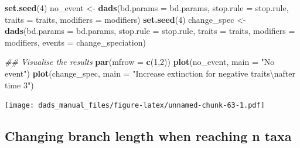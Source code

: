 \documentclass[]{book}
\newenvironment{Shaded}{\begin{snugshade}}{\end{snugshade}}
\newcommand{\CharTok}[1]{\textcolor[rgb]{0.31,0.60,0.02}{#1}}
\newcommand{\CommentTok}[1]{\textcolor[rgb]{0.56,0.35,0.01}{\textit{#1}}}
\newcommand{\DataTypeTok}[1]{\textcolor[rgb]{0.13,0.29,0.53}{#1}}
\newcommand{\DecValTok}[1]{\textcolor[rgb]{0.00,0.00,0.81}{#1}}
\newcommand{\KeywordTok}[1]{\textcolor[rgb]{0.13,0.29,0.53}{\textbf{#1}}}
\newcommand{\NormalTok}[1]{#1}
\newcommand{\StringTok}[1]{\textcolor[rgb]{0.31,0.60,0.02}{#1}}
\begin{document}
\begin{Shaded}
\begin{Highlighting}[]
\KeywordTok{set.seed}\NormalTok{(}\DecValTok{4}\NormalTok{)}
\NormalTok{no_event <-}\StringTok{ }\KeywordTok{dads}\NormalTok{(}\DataTypeTok{bd.params =}\NormalTok{ bd.params,}
                 \DataTypeTok{stop.rule =}\NormalTok{ stop.rule,}
                 \DataTypeTok{traits    =}\NormalTok{ traits,}
                 \DataTypeTok{modifiers =}\NormalTok{ modifiers)}
\KeywordTok{set.seed}\NormalTok{(}\DecValTok{4}\NormalTok{)}
\NormalTok{change_spec <-}\StringTok{ }\KeywordTok{dads}\NormalTok{(}\DataTypeTok{bd.params =}\NormalTok{ bd.params,}
                    \DataTypeTok{stop.rule =}\NormalTok{ stop.rule,}
                    \DataTypeTok{traits    =}\NormalTok{ traits,}
                    \DataTypeTok{modifiers =}\NormalTok{ modifiers,}
                    \DataTypeTok{events    =}\NormalTok{ change_speciation)}

\CommentTok{## Visualise the results}
\KeywordTok{par}\NormalTok{(}\DataTypeTok{mfrow =} \KeywordTok{c}\NormalTok{(}\DecValTok{1}\NormalTok{,}\DecValTok{2}\NormalTok{))}
\KeywordTok{plot}\NormalTok{(no_event, }\DataTypeTok{main =} \StringTok{"No event"}\NormalTok{)}
\KeywordTok{plot}\NormalTok{(change_spec, }\DataTypeTok{main =} \StringTok{"Increase extinction for negative traits}\CharTok{\textbackslash{}n}\StringTok{after time 3"}\NormalTok{)}
\end{Highlighting}
\end{Shaded}

\texttt{[image: dads\_manual\_files/figure-latex/unnamed-chunk-63-1.pdf]}

\hypertarget{changing-branch-length-when-reaching-n-taxa}{%
\subsection{Changing branch length when reaching n taxa}\label{changing-branch-length-when-reaching-n-taxa}}
\end{document}

